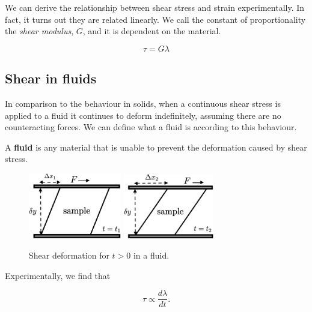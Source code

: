 We can derive the relationship between shear stress and strain experimentally. In fact, it turns out they are related linearly. We call the constant of proportionality the \textit{shear modulus}, $G$, and it is dependent on the material.

\begin{equation} \label{eq:shear-in-solids}
  \tau = G \lambda
\end{equation}


\subsection*{Shear in fluids}

In comparison to the behaviour in solids, when a continuous shear stress is applied to a fluid it continues to deform indefinitely, assuming there are no counteracting forces. We can define what a fluid is according to this behaviour.

\begin{definition}
  A \textbf{fluid} is any material that is unable to prevent the deformation caused by shear stress.
\end{definition}

\begin{figure}[h] \label{fig:shear-fluid}
  \centering
  \includegraphics[width=4.05cm]{fig/shear-fluid-t1.png}
  \includegraphics[width=3.95cm]{fig/shear-fluid-t2.png}
  \caption{Shear deformation for $t>0$ in a fluid.}
\end{figure}

Experimentally, we find that

\begin{equation}
  \tau \propto \frac{ d \lambda }{ d t }.
\end{equation}

